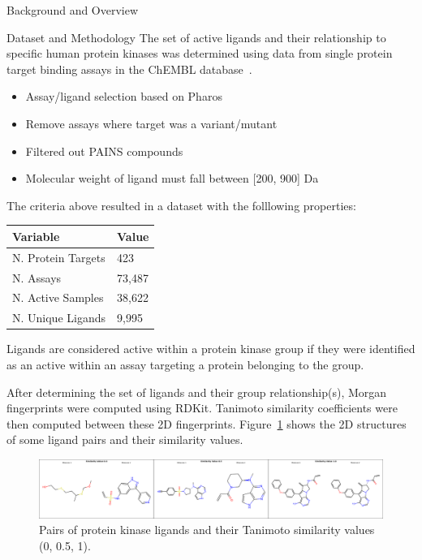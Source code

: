 \documentclass[final]{beamer}
\newlength{\colwidth}
\begin{document}
\begin{frame}[t]
\begin{columns}[t]
\begin{column}{\colwidth}
\begin{block}{Background and Overview}
  \end{block}

  \begin{block}{Dataset and Methodology}
    \small
    The set of active ligands and their relationship to specific human protein kinases was determined using data from single protein target binding assays in the ChEMBL database~\cite{chembl_db_2023}. 
    \begin{itemize}
        \item Assay/ligand selection based on Pharos~\cite{pharos_2022}
        \item Remove assays where target was a variant/mutant
        \item Filtered out PAINS compounds~\cite{baell_holloway_2010}
        \item Molecular weight of ligand must fall between [200, 900] Da
    \end{itemize}

    The criteria above resulted in a dataset with the folllowing properties:

    \begin{table}[!ht]
    \centering
    \footnotesize
    \begin{tabular}{l|l}
        \hline
        \textbf{Variable} & \textbf{Value} \\ \hline
        N. Protein Targets & 423 \\ \hline
        N. Assays & 73,487 \\ \hline
        N. Active Samples & 38,622 \\ \hline
        N. Unique Ligands & 9,995 \\ \hline
    \end{tabular}
    \end{table}

    Ligands are considered active within a protein kinase group if they were identified as an active within an assay targeting a protein belonging to the group. 

    After determining the set of ligands and their group relationship(s), Morgan fingerprints were computed using RDKit. Tanimoto similarity coefficients were then computed between these 2D fingerprints. Figure~\ref{ligand_sim} shows the 2D structures of some ligand pairs and their similarity values.
\begin{figure}
    \centering
    \includegraphics[width=\textwidth]{../figures/ligand_sim.png}
    \caption{Pairs of protein kinase ligands and their Tanimoto similarity values (0, 0.5, 1).}
    \label{ligand_sim}
\end{figure}


\end{block}
\end{column}
\end{columns}
\end{frame}
\end{document}
